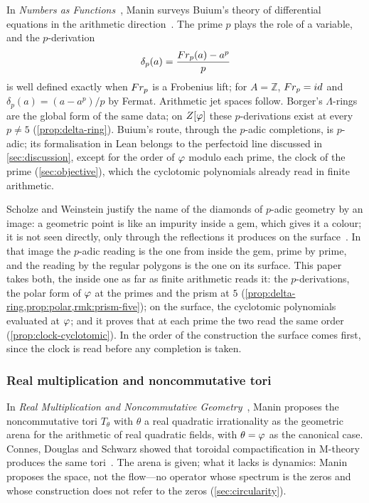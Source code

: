 In \emph{Numbers as Functions}~\cite{manin13}, Manin surveys Buium's theory of
differential equations in the arithmetic direction~\cite{buium05}.  The prime
$p$ plays the role of a variable, and the $p$-derivation
\begin{equation}\label{eq:buium}
  \delta_p(a) = \frac{Fr_p(a) - a^p}{p}
\end{equation}
is well defined exactly when $Fr_p$ is a Frobenius lift; for $A=\mathbb{Z}$,
$Fr_p=id$ and $\delta_p(a)=(a-a^p)/p$ by Fermat.  Arithmetic jet
spaces follow.  Borger's $\Lambda$-rings are the global form of the same data; on $Z[\varphi]$ these $p$-derivations exist at every $p\neq5$ (\cref{prop:delta-ring}).
Buium's route, through the $p$-adic completions, is
$p$-adic; its formalisation in Lean belongs to the
perfectoid line discussed in \cref{sec:discussion},
except for the order of $\varphi$ modulo each prime, the clock of the prime (\cref{sec:objective}), which the
cyclotomic polynomials already read in finite arithmetic.

Scholze and Weinstein justify the name of the diamonds of $p$-adic geometry by an image: a geometric point is
like an impurity inside a gem, which gives it a colour; it is not seen directly, only through the reflections it
produces on the surface~\cite[\S9.2]{scholzeweinstein20}.  In that image the $p$-adic reading is the one from
inside the gem, prime by prime, and the reading by the regular polygons is the one on its surface.  This paper
takes both, the inside one as far as finite arithmetic reads it: the $p$-derivations, the polar form of $\varphi$
at the primes and the prism at $5$ (\cref{prop:delta-ring,prop:polar,rmk:prism-five}); on the surface, the cyclotomic polynomials evaluated at
$\varphi$; and it proves that at each prime the two read the same order (\cref{prop:clock-cyclotomic}).  In the
order of the construction the surface comes first, since the clock is read before any completion is taken.

\subsubsection{Real multiplication and noncommutative tori}

In \emph{Real Multiplication and Noncommutative Geometry}~\cite{manin04}, Manin
proposes the noncommutative tori $T_\theta$ with $\theta$ a real quadratic
irrationality as the geometric arena for the arithmetic of real quadratic
fields, with $\theta=\varphi$ as the canonical case.  Connes, Douglas and
Schwarz showed that toroidal compactification in M-theory produces the same
tori~\cite{connes98}.  The arena is given; what it lacks is dynamics: Manin
proposes the space, not the flow---no operator whose spectrum is the zeros and
whose construction does not refer to the zeros (\cref{sec:circularity}).

